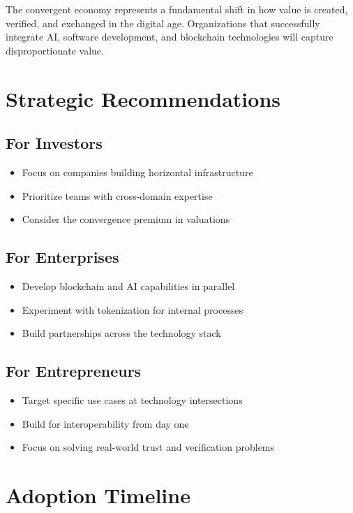 \documentclass[11pt,a4paper]{report}
\begin{document}
The convergent economy represents a fundamental shift in how value is created, verified, and exchanged in the digital age. Organizations that successfully integrate AI, software development, and blockchain technologies will capture disproportionate value.

\section{Strategic Recommendations}

\subsection{For Investors}
\begin{itemize}
\item Focus on companies building horizontal infrastructure
\item Prioritize teams with cross-domain expertise
\item Consider the convergence premium in valuations
\end{itemize}

\subsection{For Enterprises}
\begin{itemize}
\item Develop blockchain and AI capabilities in parallel
\item Experiment with tokenization for internal processes
\item Build partnerships across the technology stack
\end{itemize}

\subsection{For Entrepreneurs}
\begin{itemize}
\item Target specific use cases at technology intersections
\item Build for interoperability from day one
\item Focus on solving real-world trust and verification problems
\end{itemize}

\section{Adoption Timeline}
\end{document}
